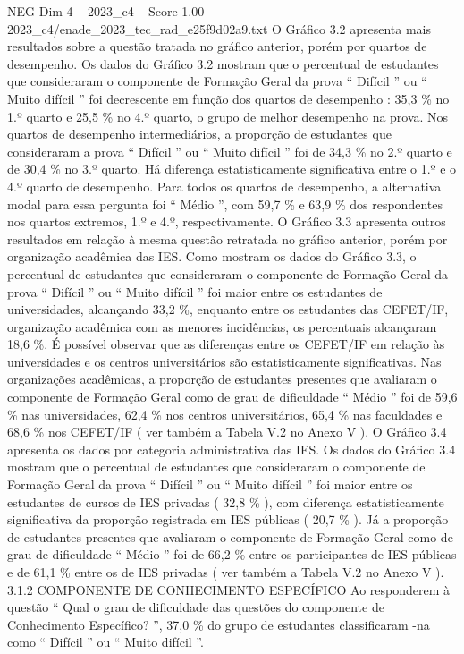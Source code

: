 \begin{textsample}{NEG Dim 4 – 2023\_c4 – Score 1.00 – 2023\_c4/enade\_2023\_tec\_rad\_e25f9d02a9.txt}
O Gráfico 3.2 apresenta mais resultados sobre a questão tratada no gráfico anterior, porém por quartos de desempenho.
Os dados do Gráfico 3.2 mostram que o percentual de estudantes que consideraram o componente de Formação Geral da prova “ Difícil ” ou “ Muito difícil ” foi decrescente em função dos quartos de desempenho : 35,3 \% no 1.º quarto e 25,5 \% no 4.º quarto, o grupo de melhor desempenho na prova.
Nos quartos de desempenho intermediários, a proporção de estudantes que consideraram a prova “ Difícil ” ou “ Muito difícil ” foi de 34,3 \% no 2.º quarto e de 30,4 \% no 3.º quarto.
Há diferença estatisticamente significativa entre o 1.º e o 4.º quarto de desempenho.
Para todos os quartos de desempenho, a alternativa modal para essa pergunta foi “ Médio ”, com 59,7 \% e 63,9 \% dos respondentes nos quartos extremos, 1.º e 4.º, respectivamente.
O Gráfico 3.3 apresenta outros resultados em relação à mesma questão retratada no gráfico anterior, porém por organização acadêmica das IES.
Como mostram os dados do Gráfico 3.3, o percentual de estudantes que consideraram o componente de Formação Geral da prova “ Difícil ” ou “ Muito difícil ” foi maior entre os estudantes de universidades, alcançando 33,2 \%, enquanto entre os estudantes das CEFET/IF, organização acadêmica com as menores incidências, os percentuais alcançaram 18,6 \%.
É possível observar que as diferenças entre os CEFET/IF em relação às universidades e os centros universitários são estatisticamente significativas.
Nas organizações acadêmicas, a proporção de estudantes presentes que avaliaram o componente de Formação Geral como de grau de dificuldade “ Médio ” foi de 59,6 \% nas universidades, 62,4 \% nos centros universitários, 65,4 \% nas faculdades e 68,6 \% nos CEFET/IF ( ver também a Tabela V.2 no Anexo V ).
O Gráfico 3.4 apresenta os dados por categoria administrativa das IES.
Os dados do Gráfico 3.4 mostram que o percentual de estudantes que consideraram o componente de Formação Geral da prova “ Difícil ” ou “ Muito difícil ” foi maior entre os estudantes de cursos de IES privadas ( 32,8 \% ), com diferença estatisticamente significativa da proporção registrada em IES públicas ( 20,7 \% ).
Já a proporção de estudantes presentes que avaliaram o componente de Formação Geral como de grau de dificuldade “ Médio ” foi de 66,2 \% entre os participantes de IES públicas e de 61,1 \% entre os de IES privadas ( ver também a Tabela V.2 no Anexo V ). 3.1.2 COMPONENTE DE CONHECIMENTO ESPECÍFICO Ao responderem à questão “ Qual o grau de dificuldade das questões do componente de Conhecimento Específico? ”, 37,0 \% do grupo de estudantes classificaram -na como “ Difícil ” ou “ Muito difícil ”.

\end{textsample}
